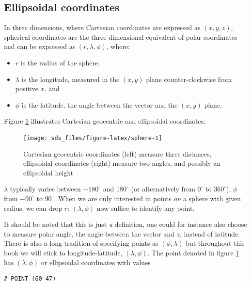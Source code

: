 \documentclass[]{book}
\providecommand{\tightlist}{%
  \setlength{\itemsep}{0pt}\setlength{\parskip}{0pt}}
\begin{document}
\hypertarget{ellipsoidal-coordinates-1}{%
\subsection{Ellipsoidal coordinates}\label{ellipsoidal-coordinates-1}}

In three dimensions, where Cartesian coordinates are expressed as
\((x,y,z)\), spherical coordinates are the three-dimensional equivalent
of polar coordinates and can be expressed as \((r,\lambda,\phi)\), where:

\begin{itemize}
\tightlist
\item
  \(r\) is the radius of the sphere,
\item
  \(\lambda\) is the longitude, measured in the \((x,y)\) plane counter-clockwise from positive \(x\), and
\item
  \(\phi\) is the latitude, the angle between the vector and the \((x,y)\) plane.
\end{itemize}

Figure \ref{fig:sphere} illustrates Cartesian geocentric and
ellipsoidal coordinates.

\begin{figure}

{\centering \texttt{[image: sds\_files/figure-latex/sphere-1]} 

}

\caption{Cartesian geocentric coordinates (left) measure three distances, ellipsoidal coordinates (right) measure two angles, and possibly an ellipsoidal height}\label{fig:sphere}
\end{figure}

\(\lambda\) typically varies between \(-180^{\circ}\) and \(180^{\circ}\)
(or alternatively from \(0^{\circ}\) to \(360^{\circ}\)), \(\phi\) from
\(-90^{\circ}\) to \(90^{\circ}\). When we are only interested in points
\emph{on} a sphere with given radius, we can drop \(r\): \((\lambda,\phi)\)
now suffice to identify any point.

It should be noted that this is just \emph{a} definition, one could for
instance also choose to measure polar angle, the angle between
the vector and \(z\), instead of latitude. There is also a long
tradition of specifying points as \((\phi,\lambda)\) but throughout
this book we will stick to longitude-latitude, \((\lambda,\phi)\).
The point denoted in figure \ref{fig:sphere} has \((\lambda,\phi)\)
or ellipsoidal coordinates with values

\begin{verbatim}
# POINT (60 47)
\end{verbatim}
\end{document}
